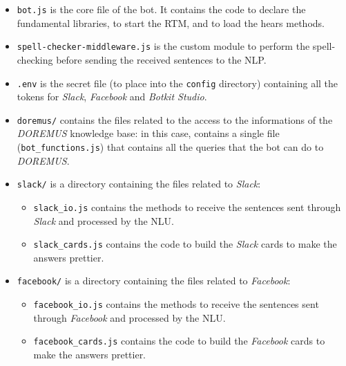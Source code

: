 \documentclass[a4paper,12pt]{report}
\begin{document}
	\begin{itemize}
		\item \texttt{bot.js} is the core file of the bot. It contains the code to declare the fundamental libraries, to start the RTM, and to load the hears methods.
		
		\item \texttt{spell-checker-middleware.js} is the custom module to perform the spell-checking before sending the received sentences to the NLP.
		
		\item \texttt{.env} is the secret file (to place into the \texttt{config} directory) containing all the tokens for \textit{Slack}, \textit{Facebook} and \textit{Botkit Studio}.
		
		\item \texttt{doremus/} contains the files related to the access to the informations of the \textit{DOREMUS} knowledge base: in this case, contains a single file (\texttt{bot\_functions.js}) that contains all the queries that the bot can do to \textit{DOREMUS}.
		
		\item \texttt{slack/} is a directory containing the files related to \textit{Slack}:
			\begin{itemize}
			\item \texttt{slack\_io.js} contains the methods to receive the sentences sent through \textit{Slack} and processed by the NLU.
			
			\item \texttt{slack\_cards.js} contains the code to build the \textit{Slack} cards to make the answers prettier.
			\end{itemize}
		\item \texttt{facebook/} is a directory containing the files related to \textit{Facebook}:
			\begin{itemize}
			\item \texttt{facebook\_io.js} contains the methods to receive the sentences sent through \textit{Facebook} and processed by the NLU.
			
			\item \texttt{facebook\_cards.js} contains the code to build the \textit{Facebook} cards to make the answers prettier.
			\end{itemize}
	\end{itemize}
	
\end{document}
